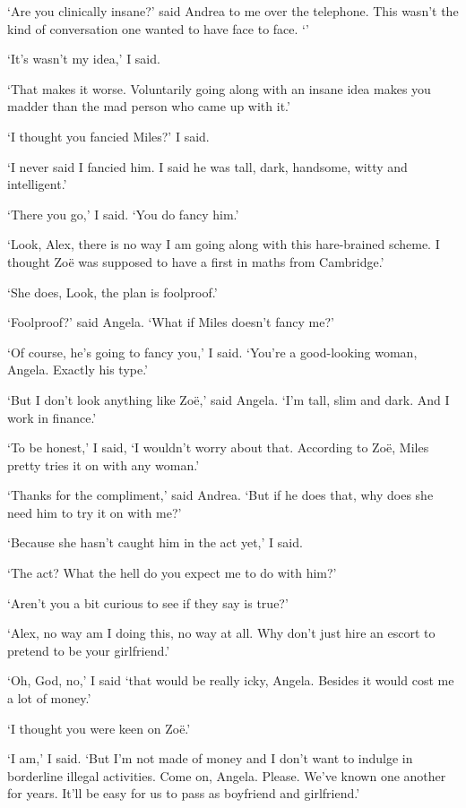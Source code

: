 `Are you clinically insane?' said Andrea to me over the telephone.
This wasn't the kind of conversation one wanted to have face to
face. `'

`It's wasn't my idea,' I said.

`That makes it worse. Voluntarily going along with an insane idea
makes you madder than the mad person who came up with it.'

`I thought you fancied Miles?' I said.

`I never said I fancied him. I said he was tall, dark, handsome,
witty and intelligent.'

`There you go,' I said. `You {\twelveit do\/} fancy him.'

`Look, Alex, there is no way I am going along with this hare-brained
scheme. I thought Zoë was supposed to have a first in maths from
Cambridge.'

`She does, Look, the plan is foolproof.'

`Foolproof?' said Angela. `What if Miles doesn't fancy me?'

`Of course, he's going to fancy you,' I said. `You're a good-looking
woman, Angela. Exactly his type.'

`But I don't look anything like Zoë,' said Angela. `I'm tall,
slim and dark. And I work in finance.'

`To be honest,' I said, `I wouldn't worry about that. According to
Zoë, Miles pretty tries it on with any woman.'

`Thanks for the compliment,' said Andrea. `But if he does that, why
does she need him to try it on with me?'

`Because she hasn't caught him in the act yet,' I said.

`The act? What the hell do you expect me to do with him?'

`Aren't you a bit curious to see if they say is true?'

`Alex, no way am I doing this, no way at all. Why don't just hire an
escort to pretend to be your girlfriend.'

`Oh, God, no,' I said `that would be really icky, Angela. Besides it
would cost me a lot of money.'

`I thought you were keen on Zoë.'

`I am,' I said. `But I'm not made of money and I don't want to indulge in borderline illegal activities. Come on, Angela. Please. We've known one another
for years. It'll be easy for us to pass as boyfriend and
girlfriend.'

